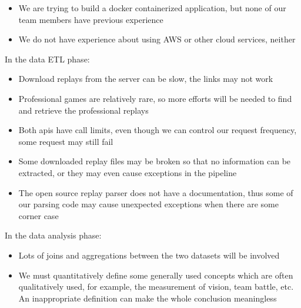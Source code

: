 \documentclass{article}
\begin{document}
\begin{itemize}
	\item We are trying to build a docker containerized application, but none of our team members have previous experience
	\item We do not have experience about using AWS or other cloud services, neither
\end{itemize}

In the data ETL phase:

\begin{itemize}
	\item Download replays from the server can be slow, the links may not work
	\item Professional games are relatively rare, so more efforts will be needed to find and retrieve the professional replays
	\item Both apis have call limits, even though we can control our request frequency, some request may still fail
	\item Some downloaded replay files may be broken so that no information can be extracted, or they may even cause exceptions in the pipeline
	\item The open source replay parser does not have a documentation, thus some of our parsing code may cause unexpected exceptions when there are some corner case
\end{itemize}


In the data analysis phase:

\begin{itemize}
	\item Lots of joins and aggregations between the two datasets will be involved
	\item We must quantitatively define some generally used concepts which are often qualitatively used, for example, the measurement of vision, team battle, etc. An inappropriate definition can make the whole conclusion meaningless
\end{itemize}


\end{document}
